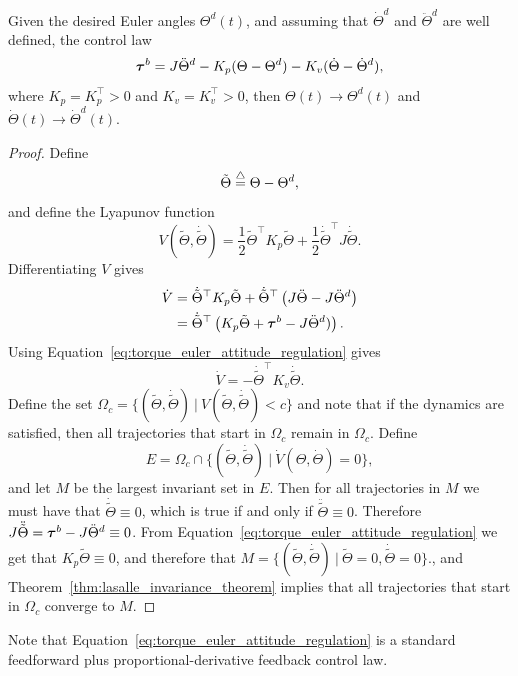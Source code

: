 \begin{theorem}\label{thm:euler_attitude_stabilization}
	Given the desired Euler angles $\Theta^d(t)$, and assuming that $\dot{\Theta}^d$ and $\ddot{\Theta}^d$ are well defined, the control law
	\begin{equation}\label{eq:torque_euler_attitude_regulation}
	\taubf^b = J\ddot{\Theta}^d - K_p (\Theta-\Theta^d) - K_v (\dot{\Theta}-\dot{\Theta}^d),
	\end{equation}
	where $K_p=K_p^\top >0$ and $K_v=K_v^\top > 0$, then $\Theta(t)\to\Theta^d(t)$ and $\dot{\Theta}(t)\to\dot{\Theta}^d(t)$.
\end{theorem}
\begin{proof}
Define
\[
\tilde{\Theta} \stackrel{\triangle}{=} \Theta - \Theta^d,
\]
and define the Lyapunov function
\[
V(\tilde{\Theta}, \dot{\tilde{\Theta}}) = \frac{1}{2}\tilde{\Theta}^\top K_p \tilde{\Theta} + \frac{1}{2}\dot{\tilde{\Theta}}^\top J \dot{\tilde{\Theta}}.
\]
Differentiating $V$ gives
\begin{align*}
\dot{V} &= \dot{\tilde{\Theta}}^\top K_p	 \tilde{\Theta} + \dot{\tilde{\Theta}}^\top \left( J\ddot{\Theta} - J\ddot{\Theta}^d\right) \\
	&= \dot{\tilde{\Theta}}^\top \left( K_p	 \tilde{\Theta} + \boldsymbol{\tau}^b - J\ddot{\Theta}^d) \right).
\end{align*}
Using Equation~\eqref{eq:torque_euler_attitude_regulation} gives
\[
\dot{V} = -\dot{\tilde{\Theta}}^\top K_v \dot{\tilde{\Theta}}.
\]
Define the set $\Omega_c = \{ (\tilde{\Theta},\dot{\tilde{\Theta}}) ~|~ V(\tilde{\Theta},\dot{\tilde{\Theta}}) < c\}$ and note that if the dynamics are satisfied, then all trajectories that start in $\Omega_c$ remain in $\Omega_c$.  Define
\[
E = \Omega_c \cap \{ (\tilde{\Theta}, \dot{\tilde{\Theta}}) ~|~ \dot{V}(\Theta, \dot{\Theta}) = 0 \},
\]
and let $M$ be the largest invariant set in $E$.  Then for all trajectories in $M$ we must have that $\dot{\tilde{\Theta}}\equiv 0$, which is true if and only if $\ddot{\tilde{\Theta}}\equiv 0$.  Therefore $J\ddot{\tilde{\Theta}} = \boldsymbol{\tau}^b - J\ddot{\Theta}^d \equiv 0$.  From Equation~\eqref{eq:torque_euler_attitude_regulation} we get that $K_p\tilde{\Theta}\equiv 0$, and therefore that $M = \{(\tilde{\Theta}, \dot{\tilde{\Theta}}) ~|~ \tilde{\Theta} = 0, \dot{\tilde{\Theta}}=0 \}.$, and Theorem~\ref{thm:lasalle_invariance_theorem} implies that all trajectories that start in $\Omega_c$ converge to $M$.
\end{proof}

Note that Equation~\eqref{eq:torque_euler_attitude_regulation} is a standard feedforward plus proportional-derivative feedback control law.  

